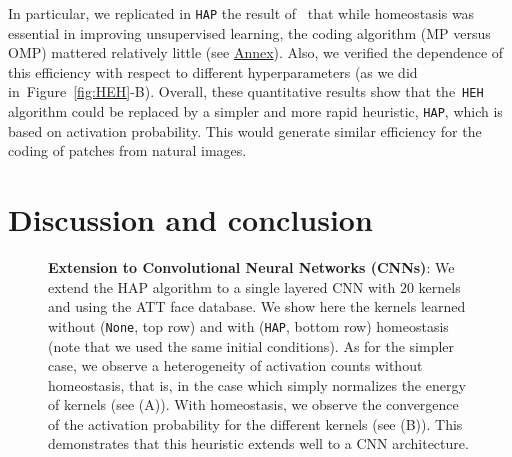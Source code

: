 \documentclass[vision,article,submit,oneauthor,pdftex]{Definitions/mdpi}
\newcommand{\seeFig}[1]{Figure~\ref{fig:#1}}%
\begin{document}
{%
In particular, we replicated in \texttt{HAP} the result of~\cite{Sandin17} that while homeostasis was essential in improving unsupervised learning, the coding algorithm (MP versus OMP) mattered relatively little (see \href{https://spikeai.github.io/HULK/#Testing-different-algorithms}{Annex}). Also, we verified the dependence of this efficiency with respect to different hyperparameters (as we did in~\seeFig{HEH}-B). %
Overall, these quantitative results show that the~\texttt{HEH} algorithm could be replaced by a simpler and more rapid heuristic, \texttt{HAP}, which is based on activation probability. This would generate similar efficiency for the coding of patches from natural images.
\section{Discussion and conclusion}\label{discussion-et-conclusion}
\begin{figure}%
\caption{
{\bf Extension to Convolutional Neural Networks (CNNs)}: %
 We extend the HAP algorithm to a single layered CNN with $20$ kernels and using the ATT face database. We show here the kernels learned without (\texttt{None}, top row) and with (\texttt{HAP}, bottom row) homeostasis (note that we used the same initial conditions). As for the simpler case, we observe a heterogeneity of activation counts without homeostasis, that is, in the case which simply normalizes the energy of kernels (see {\sf (A)}). With homeostasis, we observe the convergence of the activation probability for the different kernels (see {\sf (B)}). This demonstrates that this heuristic extends well to a CNN architecture.
}
\end{figure}}
\end{document}
